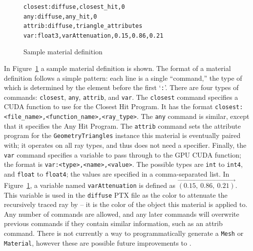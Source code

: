 \vspace{0.3em}
\begin{figure}[htb]
\centering
\begin{mdframed}[style=MyFrame,nobreak=true,align=center,userdefinedwidth=30em]
\begin{verbatim}
closest:diffuse,closest_hit,0
any:diffuse,any_hit,0
attrib:diffuse,triangle_attributes
var:float3,varAttenuation,0.15,0.86,0.21
\end{verbatim}
\end{mdframed}
\vspace{-0.3em}
\caption{Sample material definition}
\label{fig:rayterm-gpu_material_def}
\end{figure}

In Figure~\ref{fig:rayterm-gpu_material_def} a sample material definition is shown.
The format of a material definition follows a simple pattern: each line is a single ``command,'' the type of which is determined by the element before the first `\texttt{:}'.
There are four types of commands: \texttt{closest}, \texttt{any}, \texttt{attrib}, and \texttt{var}.
The \texttt{closest} command specifies a CUDA function to use for the Closest Hit Program.
It has the format \texttt{closest:<file\_name>,<function\_name>,<ray\_type>}.
The \texttt{any} command is similar, except that it specifies the Any Hit Program.
The \texttt{attrib} command sets the attribute program for the \texttt{GeometryTriangles} instance this material is eventually paired with; it operates on all ray types, and thus does not need a specifier.
Finally, the \texttt{var} command specifies a variable to pass through to the GPU CUDA function; the format is \texttt{var:<type>,<name>,<value>}.
The possible types are \texttt{int} to \texttt{int4}, and \texttt{float} to \texttt{float4}; the values are specified in a comma-separated list.
In Figure~\ref{fig:rayterm-gpu_material_def}, a variable named \texttt{varAttenuation} is defined as $\vec{(0.15,\ 0.86,\ 0.21)}$.
This variable is used in the \texttt{diffuse} PTX file as the color to attenuate the recursively traced ray by -- it is the color of the object this material is applied to.
Any number of commands are allowed, and any later commands will overwrite previous commands if they contain similar information, such as an attrib command.
There is not currently a way to programmatically generate a \texttt{Mesh} or \texttt{Material}, however these are possible future improvements to \name.


